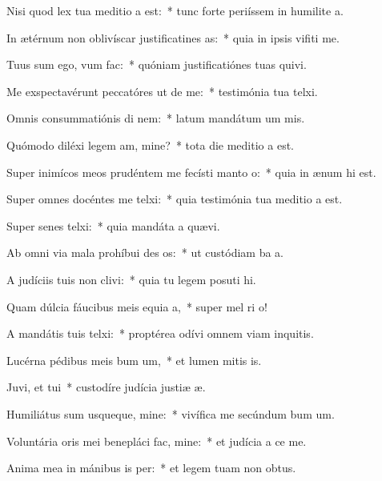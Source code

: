 \item Nisi quod lex tua meditio a est:~* tunc forte periíssem in humilite a.
\item In ætérnum non oblivíscar justificatines as:~* quia in ipsis vifiti me.
\item Tuus sum ego, vum  fac:~* quóniam justificatiónes tuas quivi.
\item Me exspectavérunt peccatóres ut de me:~* testimónia tua telxi.
\item Omnis consummatiónis di nem:~* latum mandátum um mis.
\item Quómodo diléxi legem am, mine?~* tota die meditio a est.
\item Super inimícos meos prudéntem me fecísti manto o:~* quia in ænum hi est.
\item Super omnes docéntes me telxi:~* quia testimónia tua meditio a est.
\item Super senes telxi:~* quia mandáta a quævi.
\item Ab omni via mala prohíbui des os:~* ut custódiam ba a.
\item A judíciis tuis non clivi:~* quia tu legem posuti hi.
\item Quam dúlcia fáucibus meis equia a,~* super mel ri o!
\item A mandátis tuis telxi:~* proptérea odívi omnem viam inquitis.
\item Lucérna pédibus meis bum um,~* et lumen mitis is.
\item Juvi, et tui~* custodíre judícia justiæ æ.
\item Humiliátus sum usqueque, mine:~* vivífica me secúndum bum um.
\item Voluntária oris mei benepláci fac, mine:~* et judícia a ce me.
\item Anima mea in mánibus is per:~* et legem tuam non  obtus.

